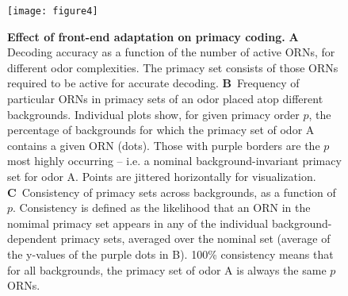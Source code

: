 \documentclass[9pt,lineno]{elife}
\begin{document}
\begin{figure}[tb]
		\texttt{[image: figure4]}
		\caption{\footnotesize{\textbf{Effect of front-end adaptation on primacy coding.}
				\textbf{A} Decoding accuracy as a function of the number of active ORNs, for different odor complexities. The primacy set consists of those ORNs required to be active for accurate decoding. %
				\textbf{B}~Frequency of particular ORNs in primacy sets of an odor placed atop different backgrounds. Individual plots show, for given primacy order $p$, the percentage of backgrounds for which the primacy set of odor A contains a given ORN (dots). Those with purple borders are the $p$ most highly occurring -- i.e. a nominal background-invariant primacy set for odor A. Points are jittered horizontally for visualization.
				\textbf{C}~Consistency of primacy sets across backgrounds, as a function of $p$. Consistency is defined as the likelihood that an ORN in the nomimal primacy set appears in any of the individual background-dependent primacy sets, averaged over the nominal set (average of the y-values of the purple dots in B). 100\% consistency means that for all backgrounds, the primacy set of odor A is always the same $p$ ORNs.
		}}
		\label{fig:primacy_coding}
\end{figure}
\end{document}
